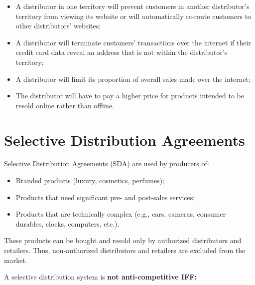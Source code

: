         \begin{itemize}
            \item A distributor in one territory will prevent customers in another distributor’s territory from viewing its website or will automatically re-route customers to other distributors’ websites;
            \item A distributor will terminate customers’ transactions over the internet if their credit card data reveal an address that is not within the distributor’s territory;
            \item A distributor will limit its proportion of overall sales made over the internet;
            \item The distributor will have to pay a higher price for products intended to be resold online rather than offline.
        \end{itemize}


\section{Selective Distribution Agreements}

    Selective Distribution Agreements (SDA) are used by producers of:
    
    \begin{itemize}
        \item Branded products (luxury, cosmetics, perfumes);
        \item Products that need significant pre- and post-sales services;
        \item Products that are technically complex (e.g., cars, cameras, consumer durables, clocks, computers, etc.).
    \end{itemize}
    
    These products can be bought and resold only by authorized distributors and retailers. Thus, non-authorized distributors and retailers are excluded from the market.
    
    
    A selective distribution system is \textbf{not anti-competitive IFF:}
    

